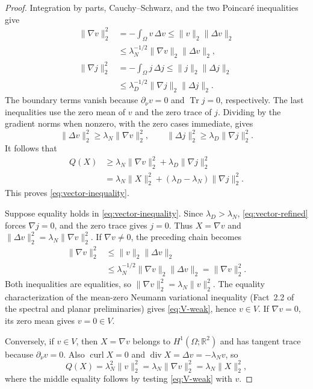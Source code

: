 \begin{proof}
Integration by parts, Cauchy--Schwarz, and the two Poincar\'e inequalities
give
\[
 \begin{aligned}
 \|\nabla v\|_2^2
 &=-\int_\Omega v\,\Delta v
 \le\|v\|_2\|\Delta v\|_2\\
 &\le\lambda_N^{-1/2}\|\nabla v\|_2\|\Delta v\|_2,\\
 \|\nabla j\|_2^2
 &=-\int_\Omega j\,\Delta j
 \le\|j\|_2\|\Delta j\|_2\\
 &\le\lambda_D^{-1/2}\|\nabla j\|_2\|\Delta j\|_2.
 \end{aligned}
\]
The boundary terms vanish because $\partial_\nu v=0$ and
$\operatorname{Tr}j=0$, respectively. The last inequalities use the
zero mean of $v$ and the zero trace of $j$. Dividing by the gradient
norms when nonzero, with the zero cases immediate, gives
\[
 \|\Delta v\|_2^2\ge\lambda_N\|\nabla v\|_2^2,
 \qquad
 \|\Delta j\|_2^2\ge\lambda_D\|\nabla j\|_2^2.
\]
It follows that
\begin{equation}\label{eq:vector-refined}
 \begin{aligned}
 Q(X)&\ge\lambda_N\|\nabla v\|_2^2
              +\lambda_D\|\nabla j\|_2^2\\
 &=\lambda_N\|X\|_2^2
              +(\lambda_D-\lambda_N)\|\nabla j\|_2^2.
 \end{aligned}
\end{equation}
This proves \cref{eq:vector-inequality}.

Suppose equality holds in \cref{eq:vector-inequality}.
Since $\lambda_D>\lambda_N$, \cref{eq:vector-refined} forces
$\nabla j=0$, and the zero trace gives $j=0$. Thus $X=\nabla v$ and
$\|\Delta v\|_2^2=\lambda_N\|\nabla v\|_2^2$.
If $\nabla v\ne0$, the preceding chain becomes
\[
 \begin{aligned}
 \|\nabla v\|_2^2
 &\le\|v\|_2\|\Delta v\|_2\\
 &\le\lambda_N^{-1/2}\|\nabla v\|_2\|\Delta v\|_2
 =\|\nabla v\|_2^2.
 \end{aligned}
\]
Both inequalities are equalities, so
$\|\nabla v\|_2^2=\lambda_N\|v\|_2^2$.
The equality characterization of the mean-zero Neumann variational
inequality (Fact~2.2 of the spectral and planar preliminaries) gives
\cref{eq:V-weak}, hence $v\in V$.
If $\nabla v=0$, its zero mean gives $v=0\in V$.

Conversely, if $v\in V$, then $X=\nabla v$ belongs to
$H^1(\Omega;\mathbb R^2)$ and has tangent trace because
$\partial_\nu v=0$. Also $\operatorname{curl}X=0$ and
$\operatorname{div}X=\Delta v=-\lambda_Nv$, so
\[
 Q(X)=\lambda_N^2\|v\|_2^2
      =\lambda_N\|\nabla v\|_2^2
      =\lambda_N\|X\|_2^2,
\]
where the middle equality follows by testing \cref{eq:V-weak} with $v$.
\end{proof}

